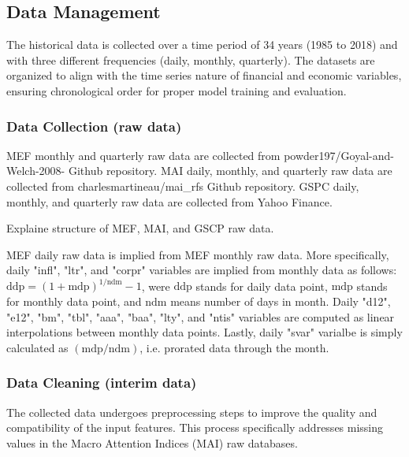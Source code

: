 \documentclass{article}
\begin{document}
\subsection{Data Management}

The historical data is collected over a time period of 34 years (1985 to 2018) and with three different frequencies (daily, monthly, quarterly). The datasets are organized to align with the time series nature of financial and economic variables, ensuring chronological order for proper model training and evaluation.

\subsubsection{Data Collection (raw data)}
MEF monthly and quarterly raw data are collected from powder197/Goyal-and-Welch-2008- Github repository. MAI daily, monthly, and quarterly raw data are collected from charlesmartineau/mai\_rfs Github repository. GSPC daily, monthly, and quarterly raw data are collected from Yahoo Finance.

Explaine structure of MEF, MAI, and GSCP raw data.

MEF daily raw data is implied from MEF monthly raw data. More specifically, daily "infl", "ltr", and "corpr" variables are implied from monthly data as follows: $\text{ddp} = (1+\text{mdp})^{1/\text{ndm}}-1$, were $\text{ddp}$ stands for daily data point, $\text{mdp}$ stands for monthly data point, and $\text{ndm}$ means number of days in month. 
Daily "d12", "e12", "bm", "tbl", "aaa", "baa", "lty", and "ntis" variables are computed as linear interpolations between monthly data points. Lastly, daily "svar" varialbe is simply calculated as $(\text{mdp}/\text{ndm})$, i.e. prorated data through the month.

\subsubsection{Data Cleaning (interim data)}

The collected data undergoes preprocessing steps to improve the quality and compatibility of the input features. This process specifically addresses missing values in the Macro Attention Indices (MAI) raw databases.
\end{document}
